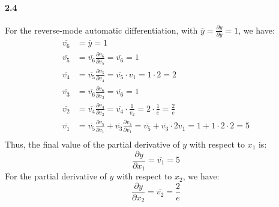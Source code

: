 \documentclass[11pt]{article}
\begin{document}
\paragraph{2.4}
For the reverse-mode automatic differentiation, with $\overline{y} = \frac{\partial y}{\partial y} = 1$, we have:
\begin{equation}
  \begin{split}
    \overline{v_6} &= \overline{y} = 1 \\
    \overline{v_5} &= \overline{v_6} \frac{\partial v_6}{\partial v_5} = \overline{v_6} = 1 \\
    \overline{v_4} &= \overline{v_5} \frac{\partial v_5}{\partial v_4} = \overline{v_5} \cdot v_1 = 1\cdot 2 = 2 \\
    \overline{v_3} &= \overline{v_6} \frac{\partial v_6}{\partial v_3} = \overline{v_6} = 1 \\
    \overline{v_2} &= \overline{v_4} \frac{\partial v_4}{\partial v_2} = \overline{v_4} \cdot \frac{1}{v_2} = 2\cdot \frac{1}{e} = \frac{2}{e} \\
    \overline{v_1} &= \overline{v_5} \frac{\partial v_5}{\partial v_1} + \overline{v_3} \frac{\partial v_3}{\partial v_1} = \overline{v_5} + \overline{v_3} \cdot 2v_1 = 1 + 1\cdot 2\cdot 2 = 5 \\
  \end{split}
\end{equation}
Thus, the final value of the partial derivative of $y$ with respect to $x_1$ is:
\begin{equation}
  \frac{\partial y}{\partial x_1} = \overline{v_1} = 5
\end{equation}
For the partial derivative of $y$ with respect to $x_2$, we have:
\begin{equation}
  \frac{\partial y}{\partial x_2} = \overline{v_2} = \frac{2}{e}
\end{equation}
\end{document}
